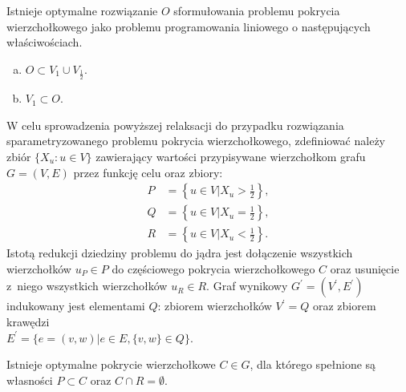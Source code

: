 \begin{theorem}
  Istnieje optymalne rozwiązanie $O$ sformułowania problemu pokrycia wierzchołkowego jako problemu programowania liniowego o następujących właściwościach.
  \begin{enumerate}[(a)]
    \item $O \subset V_1 \cup V_{\frac{1}{2}}$.
    \item $V_1 \subset O$.
  \end{enumerate}
\end{theorem}
W celu sprowadzenia powyższej relaksacji do przypadku rozwiązania
sparametryzowanego problemu pokrycia wierzchołkowego, zdefiniować należy zbiór 
$\{ X_u : u \in V \}$ zawierający wartości przypisywane wierzchołkom grafu 
$G=(V,E)$ przez funkcję celu oraz zbiory:\\
\begin{align*}
P&=\left\{u \in V | X_u>\frac{1}{2}\right\},\\
Q&=\left\{u \in V | X_u=\frac{1}{2}\right\},\\
R&=\left\{u \in V | X_u<\frac{1}{2}\right\}.
\end{align*}
Istotą redukcji dziedziny problemu do jądra jest dołączenie wszystkich
wierzchołków $u_P \in P$ do częściowego pokrycia wierzchołkowego $C$ oraz 
usunięcie z~niego wszystkich wierzchołków $u_R \in R$.
Graf wynikowy $G^\prime=(V^\prime, E^\prime)$ indukowany jest elementami $Q$: 
zbiorem wierzchołków $V^\prime=Q$ oraz zbiorem krawędzi\\$E^\prime=\{e=(v, w)| e \in E, \{v, w\} \in Q\}$.
\begin{theorem}
  Istnieje optymalne pokrycie wierzchołkowe $C \in G$, dla którego spełnione są własności $P \subset C$ oraz $C \cap R = \emptyset$.
\end{theorem}
